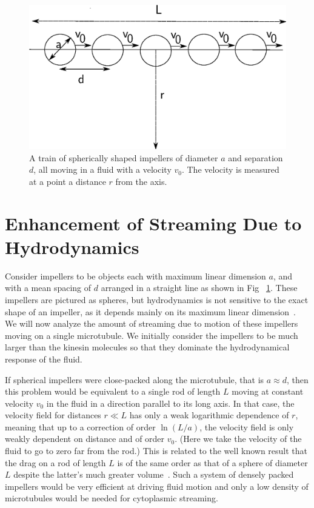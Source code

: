 \documentclass[11pt]{ucthesis}
\begin{document}
\begin{figure}[htp]
\begin{center}
\includegraphics[width=\hsize]{spheres.eps}
\caption{ 
A train of spherically shaped impellers of diameter $a$ and separation $d$, all moving in a fluid with a velocity $v_0$.
The velocity is measured at a point a distance $r$ from the axis.
}
\label{fig:spheres}
\end{center}
\end{figure}

\section{Enhancement of Streaming Due to Hydrodynamics} 

Consider impellers to be objects each with maximum linear dimension
$a$, and with a mean spacing of $d$ arranged in a straight line as shown in Fig ~\ref{fig:spheres}. 
These impellers are pictured as spheres, but hydrodynamics is not sensitive to
the exact shape of an impeller, as it depends mainly on its maximum linear dimension~\cite{BergRandomWalksinBiology}. 
We will
now analyze the amount of streaming due to motion of these impellers
moving on a single microtubule. We initially consider the impellers to be much larger than
the kinesin molecules so that they dominate the hydrodynamical response
of the fluid.

If spherical impellers were close-packed along the microtubule, that is $a \approx
d$, then this problem would be equivalent to a single rod of length $L$
moving at constant velocity $v_0$ in the fluid in a direction parallel
to its long axis.  In that case, the velocity field for distances
$r \ll L$ has only a weak logarithmic dependence of $r$, meaning that up
to a correction of order $\ln(L/a)$, the velocity field is only weakly
dependent on distance and of order $v_0$. (Here we take the velocity of the fluid
to go to zero far from the rod.)
This is related to the well
known result that the drag on a rod of length $L$ is of the same order
as that of a sphere of diameter $L$ despite the latter's much greater volume~\cite{BergRandomWalksinBiology}. Such a system of densely packed impellers would
be very efficient at driving fluid motion and only a low density of microtubules
would be needed for cytoplasmic streaming.
\end{document}
